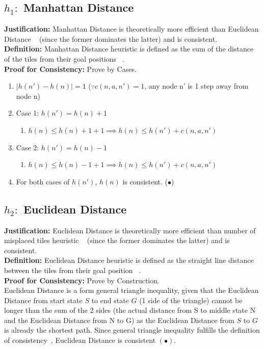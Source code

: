 \documentclass[runningheads]{llncs}
\begin{document}
\subsection{\(h_1:\) Manhattan Distance} 
\textbf{Justification:} Manhattan Distance is theoretically more efficient than Euclidean Distance ~\cite[p104]{stuart_russell_artifical_2010} (since the former dominates the latter) and is consistent. \\
\textbf{Definition:} Manhattan Distance heuristic is defined as the sum of the distance of the tiles from their goal positions ~\cite[p103]{stuart_russell_artifical_2010}. \\
\textbf{Proof for Consistency:} Prove by Cases.
\begin{enumerate}
    \item \( |h(n') - h(n)| = 1 \) (\( \because c(n, a, n') = 1 \), any node n' is 1 step away from node n)
    \item Case 1: \( h(n') = h(n) + 1 \)
    \begin{enumerate}
        \item \( h(n) \leq h(n) + 1 + 1 \implies h(n) \leq h(n') + c(n, a, n') \)
    \end{enumerate}
    \item Case 2: \( h(n') = h(n) - 1 \)
    \begin{enumerate}
        \item \( h(n) \leq h(n) - 1 + 1 \implies h(n) \leq h(n') + c(n, a, n') \)
    \end{enumerate}
    \item For both cases of \( h(n') \), \( h(n) \) is consistent. (\(\bullet\))
\end{enumerate}

\subsection{\(h_2:\) Euclidean Distance}
\textbf{Justification:} Euclidean Distance is theoretically more efficient than number of misplaced tiles heuristic ~\cite[p104]{stuart_russell_artifical_2010} (since the former dominates the latter) and is consistent. \\
\textbf{Definition:} Euclidean Distance heuristic is defined as the straight line distance between the tiles from their goal position ~\cite{rosalind_euclidean_nodate}. \\
\textbf{Proof for Consistency:} Prove by Construction. \\
Euclidean Distance is a form general triangle inequality, given that the Euclidean Distance from start state \( S \) to end state \( G \) (1 side of the triangle) cannot be longer than the sum of the 2 sides (the actual distance from S to middle state N and the Euclidean Distance from N to G) as the Euclidean Distance from \( S \) to \( G \) is already the shortest path. 
Since general triangle inequality fulfills the definition of consistency~\cite[p95]{stuart_russell_artifical_2010}, Euclidean Distance is consistent \( (\bullet) \).
\end{document}
